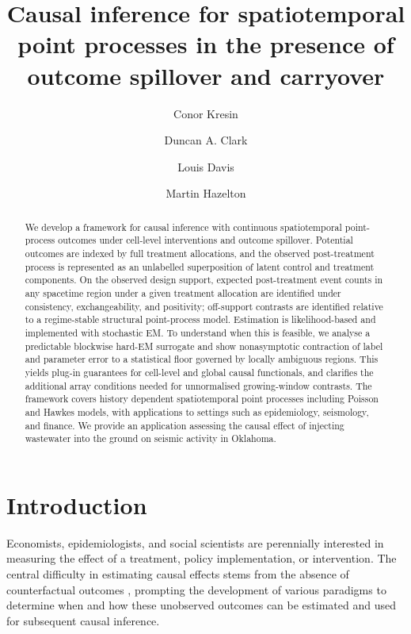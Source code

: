 \documentclass{statsoc}
\title[Spatiotemporal point process causal inference]%
{Causal inference for spatiotemporal point processes in the presence of outcome spillover and carryover}
\author[Kresin {\it et al.}]{Conor Kresin}
\author{Duncan A. Clark}
\author{Louis Davis}
\author[Kresin {\it et al.}]{Martin Hazelton}
\newcommand{\1}{\mathbbm{1}}
\begin{document}
\begin{abstract}
We develop a framework for causal inference with continuous spatiotemporal point-process outcomes under cell-level interventions and outcome spillover. Potential outcomes are indexed by full treatment allocations, and the observed post-treatment process is represented as an unlabelled superposition of latent control and treatment components. On the observed design support, expected post-treatment event counts in any spacetime region under a given treatment allocation are identified under consistency, exchangeability, and positivity; off-support contrasts are identified relative to a regime-stable structural point-process model. Estimation is likelihood-based and implemented with stochastic EM. To understand when this is feasible, we analyse a predictable blockwise hard-EM surrogate and show nonasymptotic contraction of label and parameter error to a statistical floor governed by locally ambiguous regions. This yields plug-in guarantees for cell-level and global causal functionals, and clarifies the additional array conditions needed for unnormalised growing-window contrasts. The framework covers history dependent spatiotemporal point processes including Poisson and Hawkes models, with applications to settings such as epidemiology, seismology, and finance. We provide an application assessing the causal effect of injecting wastewater into the ground on seismic activity in Oklahoma.
\end{abstract}

\section{Introduction}
Economists, epidemiologists, and social scientists are perennially interested in measuring the effect of a treatment, policy implementation, or intervention. The central difficulty in estimating causal effects stems from the absence of counterfactual outcomes \citep{rubin2005causal}, prompting the development of various paradigms \citep{pearl2009causal,splawa1990application} to determine when and how these unobserved outcomes can be estimated and used for subsequent causal inference.%
\end{document}
